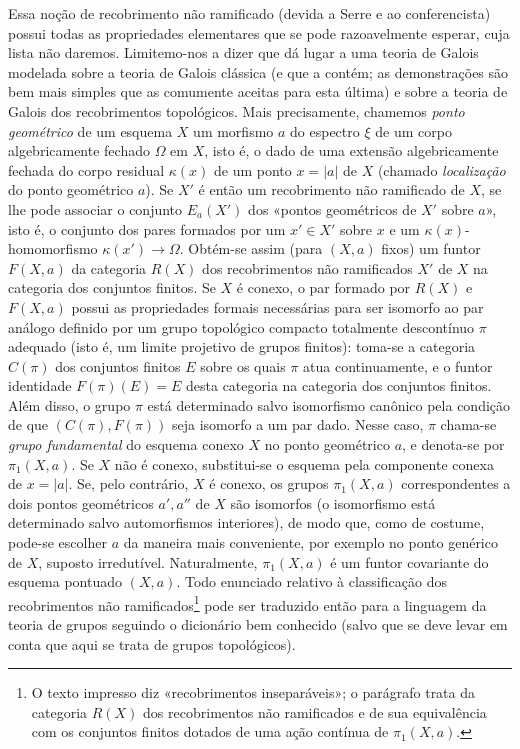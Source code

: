 Essa noção de recobrimento não ramificado (devida a Serre e ao conferencista)
possui todas as propriedades elementares que se pode razoavelmente esperar, cuja
lista não daremos. Limitemo-nos a dizer que dá lugar a uma teoria de Galois
modelada sobre a teoria de Galois clássica (e que a contém; as
demonstrações são bem mais simples que as comumente aceitas para
esta última) e sobre a teoria de Galois dos recobrimentos topológicos. Mais
precisamente, chamemos \emph{ponto geométrico} de um esquema $X$ um morfismo
$a$ do espectro $\xi$ de um corpo algebricamente fechado $\Omega$ em $X$,
isto é, o dado de uma extensão algebricamente fechada do corpo residual
$\kappa(x)$ de um ponto $x=|a|$ de $X$ (chamado \emph{localização} do ponto
geométrico $a$). Se $X'$ é então um recobrimento não ramificado de $X$, se
lhe pode associar o conjunto $E_a(X')$ dos «pontos geométricos de $X'$ sobre
$a$», isto é, o conjunto dos pares formados por um $x'\in X'$ sobre $x$
e um $\kappa(x)$-homomorfismo $\kappa(x')\longrightarrow\Omega$. Obtém-se assim
(para $(X,a)$ fixos) um funtor $F(X,a)$ da categoria $R(X)$ dos
recobrimentos não ramificados $X'$ de $X$ na categoria dos conjuntos
finitos. Se $X$ é conexo, o par formado por $R(X)$ e $F(X,a)$ possui as
propriedades formais necessárias para ser isomorfo ao par análogo definido por
um grupo topológico compacto totalmente descontínuo $\pi$ adequado (isto é,
um limite projetivo de grupos finitos): toma-se a categoria $C(\pi)$ dos
conjuntos finitos $E$ sobre os quais $\pi$ atua continuamente, e o funtor
identidade $F(\pi)(E)=E$ desta categoria na categoria dos conjuntos
finitos. Além disso, o grupo $\pi$ está determinado salvo isomorfismo canônico pela
condição de que $(C(\pi),F(\pi))$ seja isomorfo a um par dado. Nesse caso,
$\pi$ chama-se \emph{grupo fundamental} do esquema conexo $X$ no ponto
geométrico $a$, e denota-se por $\pi_1(X,a)$. Se $X$ não é conexo, substitui-se
o esquema pela componente conexa de $x=|a|$. Se, pelo contrário, $X$ é
conexo, os grupos $\pi_1(X,a)$ correspondentes a dois pontos geométricos
$a',a''$ de $X$ são isomorfos (o isomorfismo está determinado salvo
automorfismos interiores), de modo que, como de costume, pode-se escolher $a$
da maneira mais conveniente, por exemplo no ponto genérico de $X$, suposto
irredutível. Naturalmente, $\pi_1(X,a)$ é um funtor covariante do esquema
pontuado $(X,a)$. Todo enunciado relativo à classificação dos
recobrimentos não ramificados\footnote{O texto impresso diz «recobrimentos
inseparáveis»; o parágrafo trata da categoria $R(X)$ dos recobrimentos não
ramificados e de sua equivalência com os conjuntos finitos dotados de uma ação
contínua de $\pi_1(X,a)$.} pode ser traduzido então para a linguagem da teoria de
grupos seguindo o dicionário bem conhecido (salvo que se deve levar em conta
que aqui se trata de grupos topológicos).

